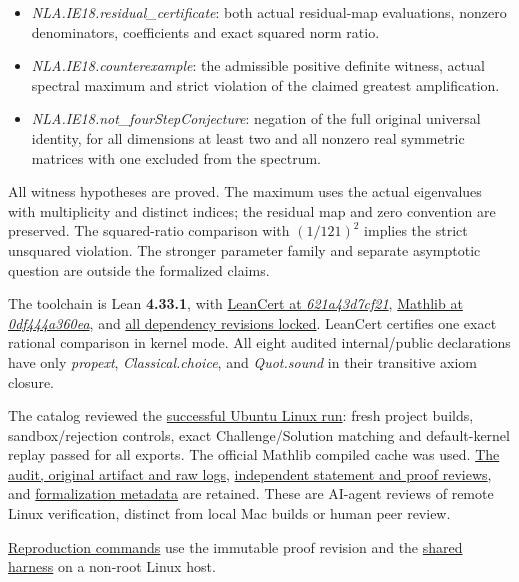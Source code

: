 \documentclass[11pt,a4paper]{article}
\providecommand{\tightlist}{\setlength{\itemsep}{0pt}\setlength{\parskip}{0pt}}
\begin{document}
\begin{itemize}
\tightlist
\item
  \textit{NLA.IE18.residual\_certificate}: both actual residual-map
  evaluations, nonzero denominators, coefficients and exact squared norm
  ratio.
\item
  \textit{NLA.IE18.counterexample}: the admissible positive definite
  witness, actual spectral maximum and strict violation of the claimed
  greatest amplification.
\item
  \textit{NLA.IE18.not\_fourStepConjecture}: negation of the full
  original universal identity, for all dimensions at least two and all
  nonzero real symmetric matrices with one excluded from the spectrum.
\end{itemize}

All witness hypotheses are proved. The maximum uses the actual
eigenvalues with multiplicity and distinct indices; the residual map and
zero convention are preserved. The squared-ratio comparison with
\((1/121)^2\) implies the strict unsquared violation. The stronger
parameter family and separate asymptotic question are outside the
formalized claims.

The toolchain is Lean \textbf{4.33.1}, with
\href{https://github.com/alerad/leancert/tree/621a43d7cf21f87872392a01e874f2f1dbddc926}{LeanCert
at \textit{621a43d7cf21}},
\href{https://github.com/leanprover-community/mathlib4/tree/0df444a360eaa60ab8c11dca51a86af692955474}{Mathlib
at \textit{0df444a360ea}}, and
\href{https://github.com/sgstepaniants/OpenProblemsInNLA/blob/7b8512e21c50adc8597dcdbed32f2aec13c3b43e/linear-systems-and-elimination/IE-18/lean/lake-manifest.json}{all
dependency revisions locked}. LeanCert certifies one exact rational
comparison in kernel mode. All eight audited internal/public
declarations have only \textit{propext}, \textit{Classical.choice}, and
\textit{Quot.sound} in their transitive axiom closure.

The catalog reviewed the
\href{https://github.com/sgstepaniants/OpenProblemsInNLA/actions/runs/34703657954}{successful
Ubuntu Linux run}: fresh project builds, sandbox/rejection controls,
exact Challenge/Solution matching and default-kernel replay passed for
all exports. The official Mathlib compiled cache was used.
\href{https://github.com/ajt60gaibb/OpenProblemsInNLA/blob/main/linear-systems-and-elimination/IE-18/lean/verification/linux-2026-09-12}{The
audit, original artifact and raw logs},
\href{https://github.com/ajt60gaibb/OpenProblemsInNLA/blob/main/linear-systems-and-elimination/IE-18/lean/reviews}{independent
statement and proof reviews}, and
\href{https://github.com/ajt60gaibb/OpenProblemsInNLA/blob/main/linear-systems-and-elimination/IE-18/lean/formalization.yaml}{formalization
metadata} are retained. These are AI-agent reviews of remote Linux
verification, distinct from local Mac builds or human peer review.

\href{https://github.com/ajt60gaibb/OpenProblemsInNLA/blob/main/linear-systems-and-elimination/IE-18/lean/README.md\#reproduction-and-evidence}{Reproduction
commands} use the immutable proof revision and the
\href{https://github.com/ajt60gaibb/OpenProblemsInNLA/blob/main/tools/lean/HARNESS.md}{shared
harness} on a non-root Linux host.
\end{document}
